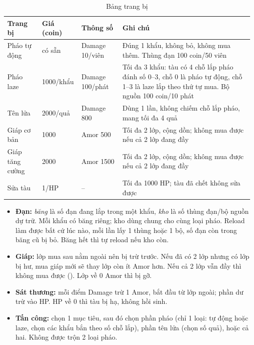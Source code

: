 \documentclass[12pt,a4paper]{article}
\newcommand{\cmd}[1]{\texttt{\seqsplit{#1}}}
\begin{document}
\begin{table}[H]\centering\small
\begin{tabularx}{\linewidth}{@{}l l l L@{}}
\toprule
\textbf{Trang bị} & \textbf{Giá (coin)} & \textbf{Thông số} & \textbf{Ghi chú} \\
\midrule
Pháo tự động & có sẵn & Damage 10/viên & Đúng 1 khẩu, không bỏ, không mua thêm. Thùng đạn 100 coin/50 viên \\
Pháo laze & 1000/khẩu & Damage 100/phát & Tối đa 3 khẩu: tàu có 4 chỗ lắp pháo đánh số 0--3, chỗ 0 là pháo tự động, chỗ 1--3 là laze lắp theo thứ tự mua. Bộ nguồn 100 coin/10 phát \\
Tên lửa & 2000/quả & Damage 800 & Dùng 1 lần, không chiếm chỗ lắp pháo, mang tối đa 4 quả \\
Giáp cơ bản & 1000 & Amor 500 & Tối đa 2 lớp, cộng dồn; không mua được nếu cả 2 lớp đang đầy \\
Giáp tăng cường & 2000 & Amor 1500 & Tối đa 2 lớp, cộng dồn; không mua được nếu cả 2 lớp đang đầy \\
Sửa tàu & 1/HP & -- & Tối đa 1000 HP; tàu đã chết không sửa được \\
\bottomrule
\end{tabularx}
\caption{Bảng trang bị}
\end{table}

\begin{itemize}
  \item \textbf{Đạn:} \emph{băng} là số đạn đang lắp trong một khẩu, \emph{kho} là số thùng đạn/bộ nguồn dự trữ. Mỗi khẩu có băng riêng; kho dùng chung cho cùng loại pháo. Reload làm được bất cứ lúc nào, mỗi lần lấy 1 thùng hoặc 1 bộ, số đạn còn trong băng cũ bị bỏ. Băng hết thì tự reload nếu kho còn.
  \item \textbf{Giáp:} lớp mua sau nằm ngoài nên bị trừ trước. Nếu đã có 2 lớp nhưng có lớp bị hư, mua giáp mới sẽ thay lớp còn ít Amor hơn. Nếu cả 2 lớp vẫn đầy thì không mua được (\cmd{7005}). Lớp về 0 Amor thì bị gỡ.
  \item \textbf{Sát thương:} mỗi điểm Damage trừ 1 Amor, bắt đầu từ lớp ngoài; phần dư trừ vào HP. HP về 0 thì tàu bị hạ, không hồi sinh.
  \item \textbf{Tấn công:} chọn 1 mục tiêu, sau đó chọn phần pháo (chỉ 1 loại: tự động hoặc laze, chọn các khẩu bắn theo số chỗ lắp), phần tên lửa (chọn số quả), hoặc cả hai. Không được trộn 2 loại pháo.
\end{itemize}
\end{document}
